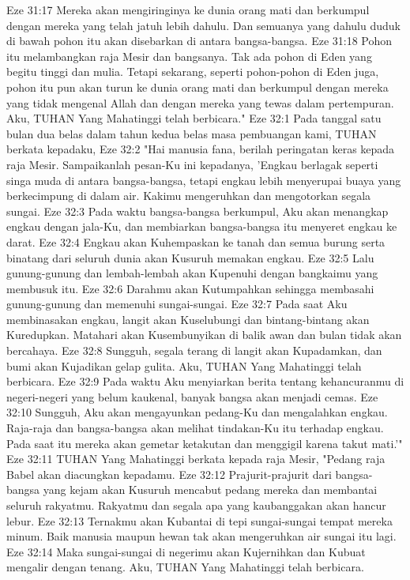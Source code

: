 Eze 31:17  Mereka akan mengiringinya ke dunia orang mati dan berkumpul dengan mereka yang telah jatuh lebih dahulu. Dan semuanya yang dahulu duduk di bawah pohon itu akan disebarkan di antara bangsa-bangsa.
Eze 31:18  Pohon itu melambangkan raja Mesir dan bangsanya. Tak ada pohon di Eden yang begitu tinggi dan mulia. Tetapi sekarang, seperti pohon-pohon di Eden juga, pohon itu pun akan turun ke dunia orang mati dan berkumpul dengan mereka yang tidak mengenal Allah dan dengan mereka yang tewas dalam pertempuran. Aku, TUHAN Yang Mahatinggi telah berbicara."
Eze 32:1  Pada tanggal satu bulan dua belas dalam tahun kedua belas masa pembuangan kami, TUHAN berkata kepadaku,
Eze 32:2  "Hai manusia fana, berilah peringatan keras kepada raja Mesir. Sampaikanlah pesan-Ku ini kepadanya, 'Engkau berlagak seperti singa muda di antara bangsa-bangsa, tetapi engkau lebih menyerupai buaya yang berkecimpung di dalam air. Kakimu mengeruhkan dan mengotorkan segala sungai.
Eze 32:3  Pada waktu bangsa-bangsa berkumpul, Aku akan menangkap engkau dengan jala-Ku, dan membiarkan bangsa-bangsa itu menyeret engkau ke darat.
Eze 32:4  Engkau akan Kuhempaskan ke tanah dan semua burung serta binatang dari seluruh dunia akan Kusuruh memakan engkau.
Eze 32:5  Lalu gunung-gunung dan lembah-lembah akan Kupenuhi dengan bangkaimu yang membusuk itu.
Eze 32:6  Darahmu akan Kutumpahkan sehingga membasahi gunung-gunung dan memenuhi sungai-sungai.
Eze 32:7  Pada saat Aku membinasakan engkau, langit akan Kuselubungi dan bintang-bintang akan Kuredupkan. Matahari akan Kusembunyikan di balik awan dan bulan tidak akan bercahaya.
Eze 32:8  Sungguh, segala terang di langit akan Kupadamkan, dan bumi akan Kujadikan gelap gulita. Aku, TUHAN Yang Mahatinggi telah berbicara.
Eze 32:9  Pada waktu Aku menyiarkan berita tentang kehancuranmu di negeri-negeri yang belum kaukenal, banyak bangsa akan menjadi cemas.
Eze 32:10  Sungguh, Aku akan mengayunkan pedang-Ku dan mengalahkan engkau. Raja-raja dan bangsa-bangsa akan melihat tindakan-Ku itu terhadap engkau. Pada saat itu mereka akan gemetar ketakutan dan menggigil karena takut mati.'"
Eze 32:11  TUHAN Yang Mahatinggi berkata kepada raja Mesir, "Pedang raja Babel akan diacungkan kepadamu.
Eze 32:12  Prajurit-prajurit dari bangsa-bangsa yang kejam akan Kusuruh mencabut pedang mereka dan membantai seluruh rakyatmu. Rakyatmu dan segala apa yang kaubanggakan akan hancur lebur.
Eze 32:13  Ternakmu akan Kubantai di tepi sungai-sungai tempat mereka minum. Baik manusia maupun hewan tak akan mengeruhkan air sungai itu lagi.
Eze 32:14  Maka sungai-sungai di negerimu akan Kujernihkan dan Kubuat mengalir dengan tenang. Aku, TUHAN Yang Mahatinggi telah berbicara.
